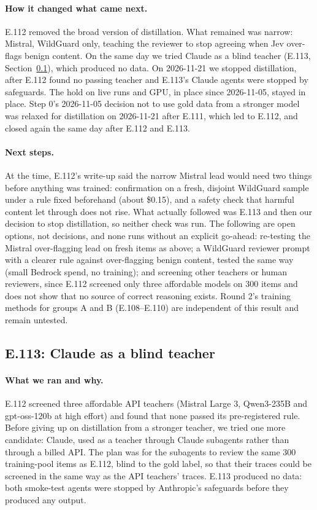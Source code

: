 \documentclass[11pt]{article}
\renewcommand{\_}{\origunderscore\allowbreak}
\begin{document}
\paragraph{How it changed what came next.}
E.112 removed the broad version of distillation. What remained was narrow: Mistral, WildGuard only, teaching the reviewer to stop agreeing when Jev over-flags benign content. On the same day we tried Claude as a blind teacher (E.113, Section~\ref{sec:e113}), which produced no data. On 2026-11-21 we stopped distillation, after E.112 found no passing teacher and E.113's Claude agents were stopped by safeguards. The hold on live runs and GPU, in place since 2026-11-05, stayed in place. Step 0's 2026-11-05 decision not to use gold data from a stronger model was relaxed for distillation on 2026-11-21 after E.111, which led to E.112, and closed again the same day after E.112 and E.113.

\paragraph{Next steps.}
At the time, E.112's write-up said the narrow Mistral lead would need two things before anything was trained: confirmation on a fresh, disjoint WildGuard sample under a rule fixed beforehand (about \$0.15), and a safety check that harmful content let through does not rise. What actually followed was E.113 and then our decision to stop distillation, so neither check was run. The following are open options, not decisions, and none runs without an explicit go-ahead: re-testing the Mistral over-flagging lead on fresh items as above; a WildGuard reviewer prompt with a clearer rule against over-flagging benign content, tested the same way (small Bedrock spend, no training); and screening other teachers or human reviewers, since E.112 screened only three affordable models on 300 items and does not show that no source of correct reasoning exists. Round 2's training methods for groups A and B (E.108--E.110) are independent of this result and remain untested.

\subsection{E.113: Claude as a blind teacher}\label{sec:e113}

\paragraph{What we ran and why.}
E.112 screened three affordable API teachers (Mistral Large 3, Qwen3-235B and gpt-oss-120b at high effort) and found that none passed its pre-registered rule. Before giving up on distillation from a stronger teacher, we tried one more candidate: Claude, used as a teacher through Claude subagents rather than through a billed API. The plan was for the subagents to review the same 300 training-pool items as E.112, blind to the gold label, so that their traces could be screened in the same way as the API teachers' traces. E.113 produced no data: both smoke-test agents were stopped by Anthropic's safeguards before they produced any output.
\end{document}
